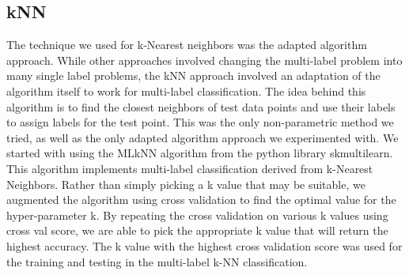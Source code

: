 \documentclass[sigconf]{acmart}
\begin{document}
\subsection{kNN}
The technique we used for k-Nearest neighbors was the adapted algorithm approach.  While other approaches involved changing the multi-label problem into many single label problems, the kNN approach involved an adaptation of the algorithm itself to work for multi-label classification. The idea behind this algorithm is to find the closest neighbors of test data points and use their labels to assign labels for the test point.  This was the only non-parametric method we tried, as well as the only adapted algorithm approach we experimented with. We started with using the MLkNN algorithm from the python library skmultilearn. This algorithm implements multi-label classification derived from k-Nearest Neighbors. Rather than simply picking a k value that may be suitable, we augmented the algorithm using cross validation to find the optimal value for the hyper-parameter k. By repeating the cross validation on various k values using cross val score, we are able to pick the appropriate k value that will return the highest accuracy. The k value with the highest cross validation score was used for the training and testing in the multi-label k-NN classification.
\end{document}
